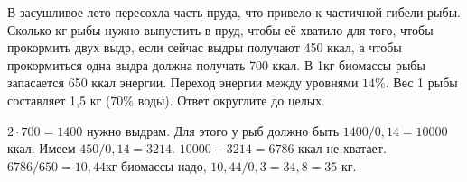 
В засушливое лето пересохла часть пруда, что привело к частичной гибели
рыбы. Сколько кг рыбы нужно выпустить в пруд, чтобы её хватило для того, чтобы
прокормить двух выдр, если сейчас выдры получают 450 ккал, а чтобы прокормиться
одна выдра должна получать 700 ккал. В 1кг биомассы рыбы запасается 650 ккал
энергии. Переход энергии между уровнями $14\%$. 
Вес 1 рыбы составляет 1,5 кг ($70\%$ воды). Ответ округлите до целых.

\solutionSection

$2 \cdot 700=1400$ нужно выдрам. Для этого у рыб должно быть $1400/0,14=10000$ ккал. Имеем $450/0,14=3214$. $10000-3214=6786$ ккал не хватает. $6786/650 = 10,44$кг биомассы надо, 
$10,44/0,3=34,8=35$ кг.

